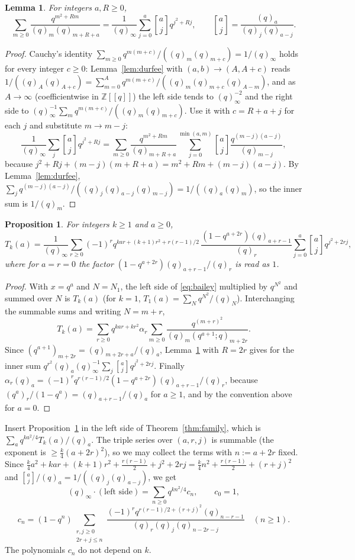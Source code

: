 \documentclass[11pt]{amsart}
\newtheorem{proposition}[theorem]{Proposition}
\newtheorem{lemma}[theorem]{Lemma}
\theoremstyle{definition}
\numberwithin{equation}{section}
\newcommand{\Z}{\mathbb{Z}}
\newcommand{\qbin}[2]{\genfrac{[}{]}{0pt}{}{#1}{#2}}
\begin{document}
\begin{lemma}\label{lem:cauchy}
For integers $a,R\ge0$,
\[
\sum_{m\ge0}\frac{q^{m^2+Rm}}{(q)_m(q)_{m+R+a}}=\frac1{(q)_\infty}\sum_{j=0}^{a}\qbin aj q^{j^2+Rj},
\qquad\qbin aj=\frac{(q)_a}{(q)_j(q)_{a-j}} .
\]
\end{lemma}
\begin{proof}
Cauchy's identity $\sum_{m\ge0}q^{m(m+c)}/((q)_m(q)_{m+c})=1/(q)_\infty$ holds for every integer $c\ge0$: Lemma~\ref{lem:durfee}
with $(a,b)\to(A,A+c)$ reads $1/((q)_A(q)_{A+c})=\sum_{m=0}^{A}q^{m(m+c)}/((q)_m(q)_{m+c}(q)_{A-m})$, and as $A\to\infty$
(coefficientwise in $\Z[[q]]$) the left side tends to $(q)_\infty^{-2}$ and the right side to
$(q)_\infty^{-1}\sum_mq^{m(m+c)}/((q)_m(q)_{m+c})$. Use it with $c=R+a+j$ for each $j$ and substitute $m\to m-j$:
\[
\frac1{(q)_\infty}\sum_j\qbin ajq^{j^2+Rj}=\sum_{m\ge0}\frac{q^{m^2+Rm}}{(q)_{m+R+a}}\sum_{j=0}^{\min(a,m)}\qbin aj\frac{q^{(m-j)(a-j)}}{(q)_{m-j}},
\]
because $j^2+Rj+(m-j)(m+R+a)=m^2+Rm+(m-j)(a-j)$. By Lemma~\ref{lem:durfee},
$\sum_jq^{(m-j)(a-j)}/((q)_j(q)_{a-j}(q)_{m-j})=1/((q)_a(q)_m)$, so the inner sum is $1/(q)_m$.
\end{proof}

\begin{proposition}\label{prop:T}
For integers $k\ge1$ and $a\ge0$,
\[
T_k(a)=\frac1{(q)_\infty}\sum_{r\ge0}(-1)^rq^{kar+(k+1)r^2+r(r-1)/2}\,\frac{(1-q^{a+2r})(q)_{a+r-1}}{(q)_r}\sum_{j=0}^{a}\qbin ajq^{j^2+2rj},
\]
where for $a=r=0$ the factor $(1-q^{a+2r})(q)_{a+r-1}/(q)_r$ is read as $1$.
\end{proposition}
\begin{proof}
With $x=q^a$ and $N=N_1$, the left side of \eqref{eq:bailey} multiplied by $q^{N^2}$ and summed over $N$ is
$T_k(a)$ (for $k=1$, $T_1(a)=\sum_Nq^{N^2}/(q)_N$). Interchanging the summable sums and writing $N=m+r$,
\[
T_k(a)=\sum_{r\ge0}q^{kar+kr^2}\alpha_r\sum_{m\ge0}\frac{q^{(m+r)^2}}{(q)_m(q^{a+1};q)_{m+2r}} .
\]
Since $(q^{a+1})_{m+2r}=(q)_{m+2r+a}/(q)_a$, Lemma~\ref{lem:cauchy} with $R=2r$ gives for the inner sum
$q^{r^2}(q)_a(q)_\infty^{-1}\sum_j\qbin ajq^{j^2+2rj}$. Finally
$\alpha_r(q)_a=(-1)^rq^{r(r-1)/2}(1-q^{a+2r})(q)_{a+r-1}/(q)_r$, because $(q^a)_r/(1-q^a)=(q)_{a+r-1}/(q)_a$ for
$a\ge1$, and by the convention above for $a=0$.
\end{proof}

Insert Proposition~\ref{prop:T} in the left side of Theorem~\ref{thm:family}, which is
$\sum_aq^{ka^2/4}T_k(a)/(q)_a$. The triple series over $(a,r,j)$ is summable (the exponent is
$\ge\frac k4(a+2r)^2$), so we may collect the terms with $n:=a+2r$ fixed. Since
$\frac k4a^2+kar+(k+1)r^2+\frac{r(r-1)}2+j^2+2rj=\frac k4n^2+\frac{r(r-1)}2+(r+j)^2$ and
$\qbin aj/(q)_a=1/((q)_j(q)_{a-j})$, we get
\begin{equation}\label{eq:cn}
(q)_\infty\cdot(\text{left side})=\sum_{n\ge0}q^{kn^2/4}c_n,\qquad c_0=1,\end{equation}
\begin{equation}\label{eq:cn2}
c_n=(1-q^n)\!\!\sum_{\substack{r,j\ge0\\2r+j\le n}}\!\!\frac{(-1)^rq^{r(r-1)/2+(r+j)^2}(q)_{n-r-1}}{(q)_r(q)_j(q)_{n-2r-j}}\quad(n\ge1).
\end{equation}
The polynomials $c_n$ do not depend on $k$.
\end{document}
